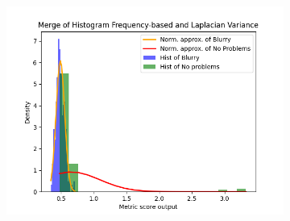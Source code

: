 \begin{figure}[H]
\begin{subfigure}[t]{0.48\textwidth}
        \caption{}
        \label{fig:HF_LV_thresh}
    \end{subfigure}\hspace{1em}
    \begin{subfigure}[t]{0.48\textwidth}
        \includegraphics[width=\textwidth]{Figures/BlurredImages/results_on_thresholds/output_dens_hf_lv.png}
        \caption{}
        \label{fig:HF_LV_dens}
    \end{subfigure}\hspace{1em}
    \caption{}
    \label{fig:HF_LV_final}
\end{figure}

